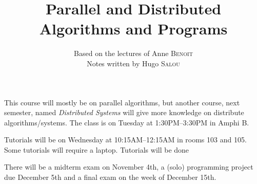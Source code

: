 \documentclass{../notes-en}
\title{Parallel and Distributed Algorithms and Programs}
\author{Based on the lectures of Anne \textsc{Benoit} \\ Notes written by Hugo \textsc{Salou}}
\begin{document}
  \maketitle

  \dominitoc
  \tableofcontents

  \pagebreak

  This course will mostly be on parallel algorithms, but another course, next semester, named \textit{Distributed Systems} will give more knowledge on distribute algorithms/systems.
  The class is on Tuesday at 1:30PM--3:30PM in Amphi B.
  
  Tutorials will be on Wednesday at 10:15AM--12:15AM in rooms 103 and 105.
  Some tutorials will require a laptop.
  Tutorials will be done

  There will be a midterm exam on November 4th, a (solo) programming project due December 5th and a final exam on the week of December 15th.

  
  
\end{document}
